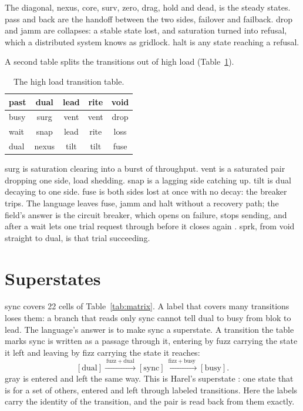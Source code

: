 The diagonal, nexus, core, surv, zero, drag, hold and dead, is the steady states. pass and back
are the handoff between the two sides, failover and failback. drop and jamm are collapses: a
stable state lost, and saturation turned into refusal, which a distributed system knows as
gridlock. halt is any state reaching a refusal.

A second table splits the transitions out of high load (Table~\ref{tab:energy}).

\begin{table}[h]
\centering
\footnotesize
\begin{tabular}{@{}l c c c c@{}}
\toprule
past & dual & lead & rite & void \\
\midrule
busy & surg & vent & vent & drop \\
wait & snap & lead & rite & loss \\
dual & nexus & tilt & tilt & fuse \\
\bottomrule
\end{tabular}
\caption{The high load transition table.}
\label{tab:energy}
\end{table}

surg is saturation clearing into a burst of throughput. vent is a saturated pair dropping one
side, load shedding. snap is a lagging side catching up. tilt is dual decaying to one side. fuse
is both sides lost at once with no decay: the breaker trips. The language leaves fuse, jamm and
halt without a recovery path; the field's answer is the circuit breaker, which opens on failure,
stops sending, and after a wait lets one trial request through before it closes again
\cite{src:Nygard}. sprk, from void straight to dual, is that trial succeeding.

\section{Superstates}

sync covers 22 cells of Table~\ref{tab:matrix}. A label that covers many transitions loses them:
a branch that reads only sync cannot tell dual to busy from blok to lead. The language's answer
is to make sync a superstate. A transition the table marks sync is written as a passage through
it, entering by fuzz carrying the state it left and leaving by fizz carrying the state it reaches:
\[
  [\mathrm{dual}] \xrightarrow{\ \mathrm{fuzz+dual}\ } [\mathrm{sync}]
  \xrightarrow{\ \mathrm{fizz+busy}\ } [\mathrm{busy}].
\]
gray is entered and left the same way. This is Harel's superstate \cite{src:Harel}: one state that
is for a set of others, entered and left through labeled transitions. Here the labels carry
the identity of the transition, and the pair is read back from them exactly.

